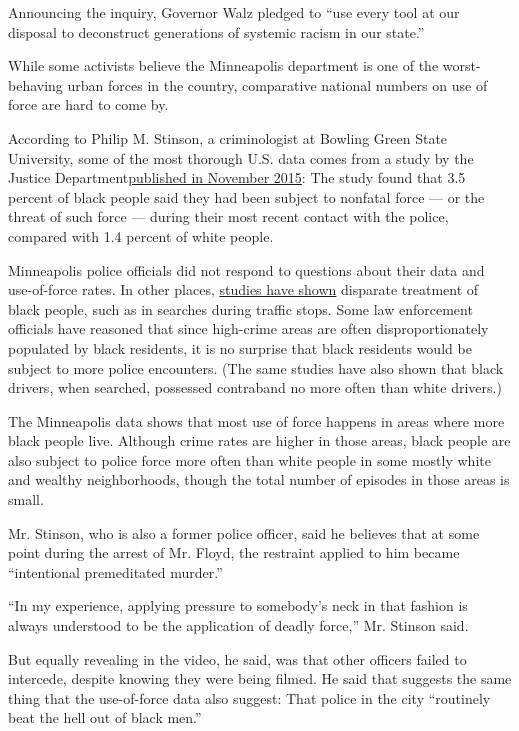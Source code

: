 Announcing the inquiry, Governor Walz pledged to ``use every tool at our
disposal to deconstruct generations of systemic racism in our state.''

While some activists believe the Minneapolis department is one of the
worst-behaving urban forces in the country, comparative national numbers
on use of force are hard to come by.

According to Philip M. Stinson, a criminologist at Bowling Green State
University, some of the most thorough U.S. data comes from a study by
the Justice
Department\href{https://www.bjs.gov/content/pub/pdf/punf0211.pdf}{}\href{https://www.bjs.gov/content/pub/pdf/punf0211.pdf}{published
in November 2015}: The study found that 3.5 percent of black people said
they had been subject to nonfatal force --- or the threat of such force
--- during their most recent contact with the police, compared with 1.4
percent of white people.

Minneapolis police officials did not respond to questions about their
data and use-of-force rates. In other places,
\href{https://www.nytimes3xbfgragh.onion/2014/11/21/us/activists-wield-search-data-to-challenge-and-change-police-policy.html}{studies
have shown} disparate treatment of black people, such as in searches
during traffic stops. Some law enforcement officials have reasoned that
since high-crime areas are often disproportionately populated by black
residents, it is no surprise that black residents would be subject to
more police encounters. (The same studies have also shown that black
drivers, when searched, possessed contraband no more often than white
drivers.)

The Minneapolis data shows that most use of force happens in areas where
more black people live. Although crime rates are higher in those areas,
black people are also subject to police force more often than white
people in some mostly white and wealthy neighborhoods, though the total
number of episodes in those areas is small.

Mr. Stinson, who is also a former police officer, said he believes that
at some point during the arrest of Mr. Floyd, the restraint applied to
him became ``intentional premeditated murder.''

``In my experience, applying pressure to somebody's neck in that fashion
is always understood to be the application of deadly force,'' Mr.
Stinson said.

But equally revealing in the video, he said, was that other officers
failed to intercede, despite knowing they were being filmed. He said
that suggests the same thing that the use-of-force data also suggest:
That police in the city ``routinely beat the hell out of black men.''

